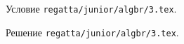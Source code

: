 \problem
Условие \texttt{regatta/junior/algbr/3.tex}.

\solution Решение \texttt{regatta/junior/algbr/3.tex}.
\endproblem
